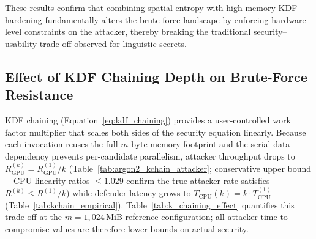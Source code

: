 \documentclass[journal,article,accept,pdftex,moreauthors]{Definitions/mdpi}
\begin{document}
These results confirm that combining spatial entropy with high-memory KDF hardening fundamentally alters the brute-force landscape by enforcing hardware-level constraints on the attacker, thereby breaking the traditional security–usability trade-off observed for linguistic secrets.

\subsection{Effect of KDF Chaining Depth on Brute-Force Resistance}
\label{sec:kchain_analysis}
\label{sec:kchain_spectrum}

KDF chaining (Equation~\ref{eq:kdf_chaining}) provides a user-controlled work factor multiplier that scales both sides of the security equation linearly. Because each invocation reuses the full $m$-byte memory footprint and the serial data dependency prevents per-candidate parallelism, attacker throughput drops to $R_\text{GPU}^{(k)} = R_\text{GPU}^{(1)} / k$ (Table~\ref{tab:argon2_kchain_attacker}; conservative upper bound---CPU linearity ratios $\leq 1.029$ confirm the true attacker rate satisfies $R^{(k)} \leq R^{(1)}/k$) while defender latency grows to $T_\text{CPU}(k) = k \cdot T_\text{CPU}^{(1)}$ (Table~\ref{tab:kchain_empirical}). Table~\ref{tab:k_chaining_effect} quantifies this trade-off at the $m=1{,}024$\,MiB reference configuration; all attacker time-to-compromise values are therefore lower bounds on actual security.
\end{document}
